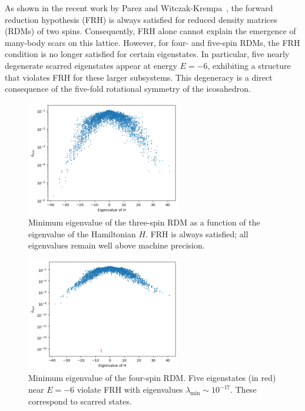 \documentclass{article}
\begin{document}
As shown in the recent work by Parez and Witczak-Krempa~\cite{parez2024}, the forward reduction hypothesis (FRH) is always satisfied for reduced density matrices (RDMs) of two spins. Consequently, FRH alone cannot explain the emergence of many-body scars on this lattice. However, for four- and five-spin RDMs, the FRH condition is no longer satisfied for certain eigenstates. In particular, five nearly degenerate scarred eigenstates appear at energy $E = -6$, exhibiting a structure that violates FRH for these larger subsystems. This degeneracy is a direct consequence of the five-fold rotational symmetry of the icosahedron.

\begin{figure}[h!]
    \centering
    \includegraphics[width=0.6\textwidth]{3spins.png}
    \caption{Minimum eigenvalue of the three-spin RDM as a function of the eigenvalue of the Hamiltonian $H$. FRH is always satisfied; all eigenvalues remain well above machine precision.}
    \label{fig:2spins}
\end{figure}

\begin{figure}[h!]
    \centering
    \includegraphics[width=0.6\textwidth]{4spins.png}
    \caption{Minimum eigenvalue of the four-spin RDM. Five eigenstates (in red) near $E = -6$ violate FRH with eigenvalues $\lambda_{\min} \sim 10^{-17}$. These correspond to scarred states.}
    \label{fig:4spins}
\end{figure}
\end{document}

